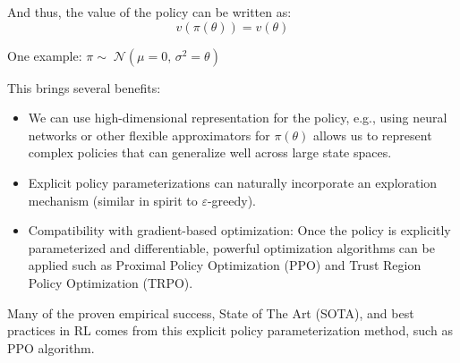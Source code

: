 And thus, the value of the policy can be written as:
\begin{equation}
    v(\pi(\theta)) = v(\theta)
\end{equation}

One example: $\pi \sim\;\mathcal{N}(\mu = 0,\,\sigma^2=\theta)$

This brings several benefits:
\begin{itemize}
    \item We can use high-dimensional representation for the policy, e.g., using neural networks or other flexible approximators for $\pi(\theta)$ allows us to represent complex policies that can generalize well across large state spaces.
    \item Explicit policy parameterizations can naturally incorporate an exploration mechanism (similar in spirit to $\varepsilon$-greedy).
    \item Compatibility with gradient-based optimization: Once the policy is explicitly parameterized and differentiable, powerful optimization algorithms can be applied such as Proximal Policy Optimization (PPO) and Trust Region Policy Optimization (TRPO).
\end{itemize}

Many of the proven empirical success, State of The Art (SOTA), and best practices in RL comes from this explicit policy parameterization method, such as PPO algorithm.  

